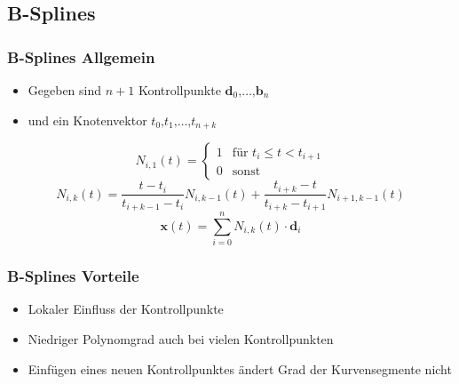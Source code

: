 \documentclass[11pt]{beamer}
\begin{document}
\subsection{B-Splines}

\begin{frame}
\frametitle{B-Splines Allgemein}
\begin{itemize}
\item Gegeben sind $n+1$ Kontrollpunkte $\mathbf{d}_0 \text{,}\dots\text{,} \mathbf{b}_n$
\item und ein Knotenvektor $t_0\text{,} t_1\text{,} \dots \text{,} t_{n+k}$
\end{itemize}
\bigskip
\begin{equation}
N_{i,1}(t) = \begin{cases}
                1 & \text{für } t_{i} \leq t < t_{i+1} \\
                0 & \text{sonst}
             \end{cases}
\end{equation}
\begin{equation}
N_{i,k}(t) = \frac{t - t_{i}}{t_{i+k-1} - t_{i}}N_{i,k-1}(t) + \frac{t_{i+k} - t}{t_{i+k} - t_{i+1}}N_{i+1,k-1}(t)
\end{equation}
\bigskip
\begin{equation}
\boxed{\mathbf{x}(t) = \sum_{i = 0}^{n} N_{i,k}(t) \cdot \mathbf{d}_{i}}
\end{equation}

\end{frame}


\begin{frame}
\frametitle{B-Splines Vorteile}
\begin{itemize}
\item Lokaler Einfluss der Kontrollpunkte
\item Niedriger Polynomgrad auch bei vielen Kontrollpunkten
\item Einfügen eines neuen Kontrollpunktes ändert Grad der Kurvensegmente nicht
\end{itemize}
\end{frame}
\end{document}
